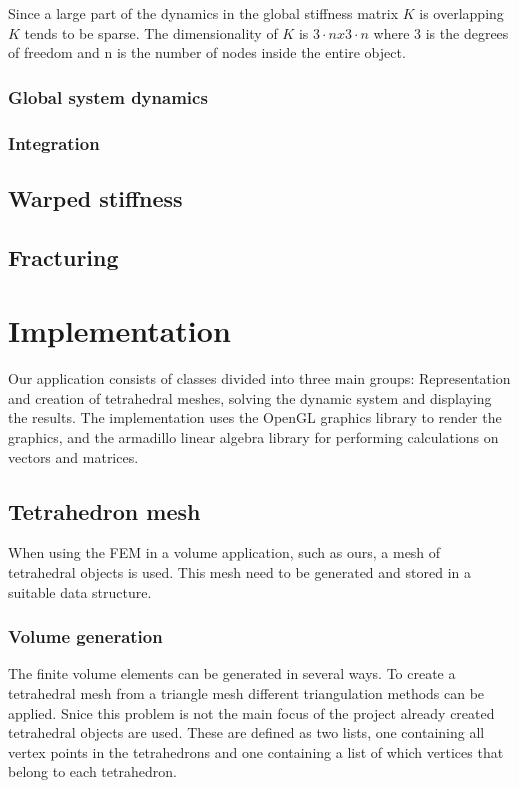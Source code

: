 \documentclass[10pt,a4paper]{article}
\begin{document}
 Since a large part of the dynamics in the global stiffness matrix $K$ is overlapping $K$ tends to be sparse. The dimensionality of $K$ is $3 \cdot n x 3 \cdot n$ where 3 is the degrees of freedom and n is the number of nodes inside the entire object.

\subsubsection{Global system dynamics}


\subsubsection{Integration}


\subsection{Warped stiffness}



\subsection{Fracturing}



\section{Implementation}
Our application consists of classes divided into three main groups: Representation and creation of tetrahedral meshes, solving the dynamic system and displaying the results. The implementation uses the OpenGL graphics library to render the graphics, and the armadillo linear algebra library for performing calculations on vectors and matrices.

\subsection{Tetrahedron mesh}
When using the FEM in a volume application, such as ours, a mesh of tetrahedral objects is used. This mesh need to be generated and stored in a suitable data structure.

\subsubsection{Volume generation}
The finite volume elements can be generated in several ways. To create a tetrahedral mesh from a triangle mesh different triangulation methods can be applied. Snice this problem is not the main focus of the project already created tetrahedral objects are used. These are defined as two lists, one containing all vertex points in the tetrahedrons and one containing a list of which vertices that belong to each tetrahedron.
\end{document}
